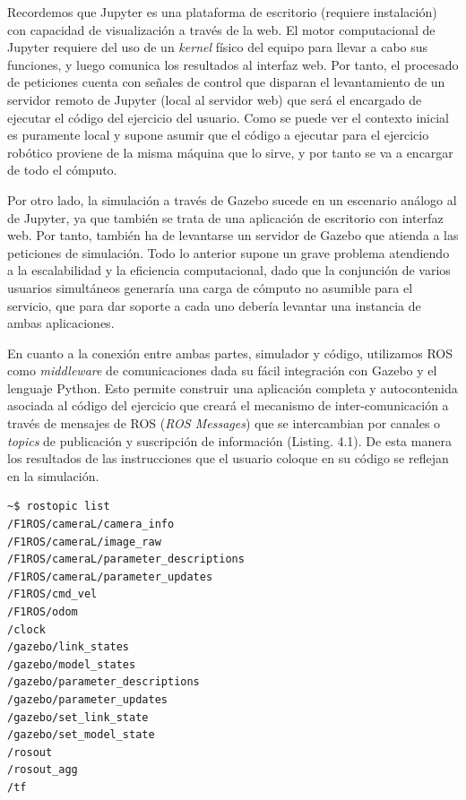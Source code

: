 Recordemos que Jupyter es una plataforma de escritorio (requiere instalación) con capacidad de visualización a través de la web. El motor computacional de Jupyter requiere del uso de un \textit{kernel} físico del equipo para llevar a cabo sus funciones, y luego comunica los resultados al interfaz web. Por tanto, el procesado de peticiones cuenta con señales de control que disparan el levantamiento de un servidor remoto de Jupyter (local al servidor web) que será el encargado de ejecutar el código del ejercicio del usuario.  Como se puede ver el contexto inicial es puramente local y supone asumir que el código a ejecutar para el ejercicio robótico proviene de la misma máquina que lo sirve, y por tanto se va a encargar de todo el cómputo. 

Por otro lado, la simulación a través de Gazebo sucede en un escenario análogo al de Jupyter, ya que también se trata de una aplicación de escritorio con interfaz web. Por tanto, también ha de levantarse un servidor de Gazebo que atienda a las peticiones de simulación. Todo lo anterior supone un grave problema atendiendo a la escalabilidad y la eficiencia computacional, dado que la conjunción de varios usuarios simultáneos generaría una carga de cómputo no asumible para el servicio, que para dar soporte a cada uno debería levantar una instancia de ambas aplicaciones.

En cuanto a la conexión entre ambas partes, simulador y código, utilizamos ROS como \textit{middleware} de comunicaciones dada su fácil integración con Gazebo y el lenguaje Python. Esto permite construir una aplicación completa y autocontenida asociada al código del ejercicio que creará el mecanismo de inter-comunicación a través de mensajes de ROS (\textit{ROS Messages}) que se intercambian por canales o \textit{topics} de publicación y suscripción de información (Listing. 4.1). De esta manera los resultados de las instrucciones que el usuario coloque en su código se reflejan en la simulación.

\begin{lstlisting}[language=bash, caption=Topics de ROS asociados a los Canales de Comunicación Internos]
~$ rostopic list
/F1ROS/cameraL/camera_info
/F1ROS/cameraL/image_raw
/F1ROS/cameraL/parameter_descriptions
/F1ROS/cameraL/parameter_updates
/F1ROS/cmd_vel
/F1ROS/odom
/clock
/gazebo/link_states
/gazebo/model_states
/gazebo/parameter_descriptions
/gazebo/parameter_updates
/gazebo/set_link_state
/gazebo/set_model_state
/rosout
/rosout_agg
/tf
\end{lstlisting}

